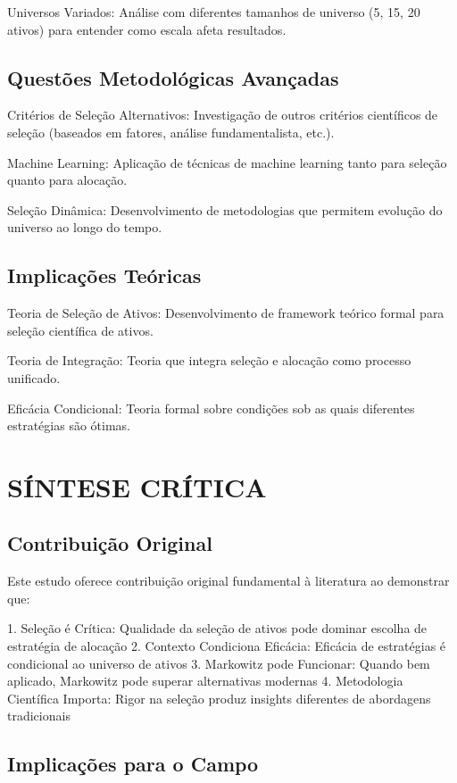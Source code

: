 Universos Variados: Análise com diferentes tamanhos de universo (5, 15, 20 ativos) para entender como escala afeta resultados.

\subsection{Questões Metodológicas Avançadas}

Critérios de Seleção Alternativos: Investigação de outros critérios científicos de seleção (baseados em fatores, análise fundamentalista, etc.).

Machine Learning: Aplicação de técnicas de machine learning tanto para seleção quanto para alocação.

Seleção Dinâmica: Desenvolvimento de metodologias que permitem evolução do universo ao longo do tempo.

\subsection{Implicações Teóricas}

Teoria de Seleção de Ativos: Desenvolvimento de framework teórico formal para seleção científica de ativos.

Teoria de Integração: Teoria que integra seleção e alocação como processo unificado.

Eficácia Condicional: Teoria formal sobre condições sob as quais diferentes estratégias são ótimas.

\section{SÍNTESE CRÍTICA}

\subsection{Contribuição Original}

Este estudo oferece contribuição original fundamental à literatura ao demonstrar que:

1. Seleção é Crítica: Qualidade da seleção de ativos pode dominar escolha de estratégia de alocação
2. Contexto Condiciona Eficácia: Eficácia de estratégias é condicional ao universo de ativos
3. Markowitz pode Funcionar: Quando bem aplicado, Markowitz pode superar alternativas modernas
4. Metodologia Científica Importa: Rigor na seleção produz insights diferentes de abordagens tradicionais

\subsection{Implicações para o Campo}

